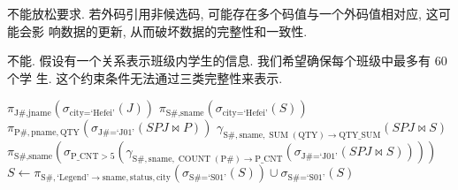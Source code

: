 \documentclass{homework}
\begin{document}
\maketitle

\question
不能放松要求. 若外码引用非候选码, 可能存在多个码值与一个外码值相对应, 这可能会影
响数据的更新, 从而破坏数据的完整性和一致性.

\question
不能. 假设有一个关系表示班级内学生的信息. 我们希望确保每个班级中最多有 60 个学
生. 这个约束条件无法通过三类完整性来表示.



\question
\begin{arabicparts}
    \questionpart{}
    $\pi_{\text{J\#}, \text{jname}}
        \left(
        \sigma_{\text{city} = \text{`Hefei'}}\left(J\right)
        \right)$
    \questionpart{}
    $\pi_{\text{S\#}, \text{sname}}
        \left(
        \sigma_{\text{city} = \text{`Hefei'}}\left(S\right)
        \right)$
    \questionpart{}
    $\pi_{\text{P\#}, \text{pname}, \text{QTY}}
        \left(
        \sigma_{\text{J\#} = \text{`J01'}}\left(SPJ\bowtie P\right)
        \right)$
    \questionpart{}
    $\gamma_{\text{S\#}, \text{sname},
            \operatorname{SUM}(\text{QTY}) \to \text{QTY\_SUM}}
        \left(SPJ \bowtie S \right)$
    \questionpart{}
    $\pi_{\text{S\#}, \text{sname}}
        \left(
        \sigma_{\text{P\_CNT} > 5}
        \left(
            \gamma_{\text{S\#}, \text{sname},
                    \operatorname{COUNT}(\text{P\#}) \to \text{P\_CNT}}
            \left(
                \sigma_{\text{J\#} = \text{`J01'}}\left(SPJ \bowtie S \right)
                \right)
            \right)
        \right)
    $
    \questionpart{}
    $S \gets \pi_{\text{S\#}, \text{`Legend'} \to \text{sname}, \text{status},
            \text{city}}
        \left(\sigma_{\text{S\#} = \text{`S01'}}\left(S\right)\right)
        \cup \sigma_{\text{S\#} = \text{`S01'}} \left(S\right)$
\end{arabicparts}
\end{document}
